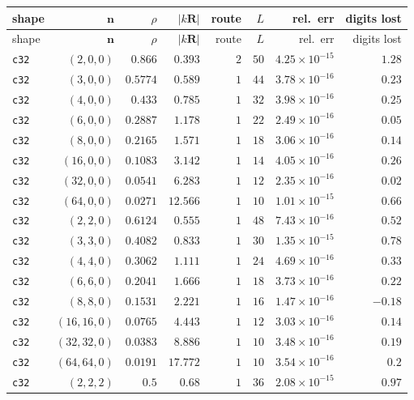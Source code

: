 \begin{longtable}{lrrrrrrr}
\toprule
shape & $\mathbf{n}$ & $\rho$ & $|k\mathbf{R}|$ & route & $L$ & rel.\ err & digits lost \\
\midrule
\endfirsthead
\toprule
shape & $\mathbf{n}$ & $\rho$ & $|k\mathbf{R}|$ & route & $L$ & rel.\ err & digits lost \\
\midrule
\endhead
\bottomrule
\endfoot
\texttt{c32} & $(2,0,0)$ & $0.866$ & $0.393$ & $2$ & $50$ & $4.25{\times}10^{-15}$ & $1.28$ \\
\texttt{c32} & $(3,0,0)$ & $0.5774$ & $0.589$ & $1$ & $44$ & $3.78{\times}10^{-16}$ & $0.23$ \\
\texttt{c32} & $(4,0,0)$ & $0.433$ & $0.785$ & $1$ & $32$ & $3.98{\times}10^{-16}$ & $0.25$ \\
\texttt{c32} & $(6,0,0)$ & $0.2887$ & $1.178$ & $1$ & $22$ & $2.49{\times}10^{-16}$ & $0.05$ \\
\texttt{c32} & $(8,0,0)$ & $0.2165$ & $1.571$ & $1$ & $18$ & $3.06{\times}10^{-16}$ & $0.14$ \\
\texttt{c32} & $(16,0,0)$ & $0.1083$ & $3.142$ & $1$ & $14$ & $4.05{\times}10^{-16}$ & $0.26$ \\
\texttt{c32} & $(32,0,0)$ & $0.0541$ & $6.283$ & $1$ & $12$ & $2.35{\times}10^{-16}$ & $0.02$ \\
\texttt{c32} & $(64,0,0)$ & $0.0271$ & $12.566$ & $1$ & $10$ & $1.01{\times}10^{-15}$ & $0.66$ \\
\texttt{c32} & $(2,2,0)$ & $0.6124$ & $0.555$ & $1$ & $48$ & $7.43{\times}10^{-16}$ & $0.52$ \\
\texttt{c32} & $(3,3,0)$ & $0.4082$ & $0.833$ & $1$ & $30$ & $1.35{\times}10^{-15}$ & $0.78$ \\
\texttt{c32} & $(4,4,0)$ & $0.3062$ & $1.111$ & $1$ & $24$ & $4.69{\times}10^{-16}$ & $0.33$ \\
\texttt{c32} & $(6,6,0)$ & $0.2041$ & $1.666$ & $1$ & $18$ & $3.73{\times}10^{-16}$ & $0.22$ \\
\texttt{c32} & $(8,8,0)$ & $0.1531$ & $2.221$ & $1$ & $16$ & $1.47{\times}10^{-16}$ & $-0.18$ \\
\texttt{c32} & $(16,16,0)$ & $0.0765$ & $4.443$ & $1$ & $12$ & $3.03{\times}10^{-16}$ & $0.14$ \\
\texttt{c32} & $(32,32,0)$ & $0.0383$ & $8.886$ & $1$ & $10$ & $3.48{\times}10^{-16}$ & $0.19$ \\
\texttt{c32} & $(64,64,0)$ & $0.0191$ & $17.772$ & $1$ & $10$ & $3.54{\times}10^{-16}$ & $0.2$ \\
\texttt{c32} & $(2,2,2)$ & $0.5$ & $0.68$ & $1$ & $36$ & $2.08{\times}10^{-15}$ & $0.97$ \\

\end{longtable}
